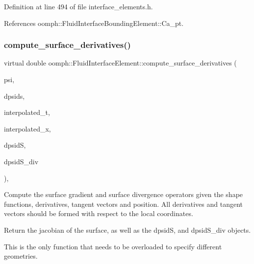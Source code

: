 Definition at line 494 of file interface\+\_\+elements.\+h.



References oomph\+::\+Fluid\+Interface\+Bounding\+Element\+::\+Ca\+\_\+pt.

\mbox{\label{classoomph_1_1FluidInterfaceElement_a0180a8e36fadbbe6984f9b3c5edffc81}} 
\subsubsection{\texorpdfstring{compute\+\_\+surface\+\_\+derivatives()}{compute\_surface\_derivatives()}}
{\footnotesize\ttfamily virtual double oomph\+::\+Fluid\+Interface\+Element\+::compute\+\_\+surface\+\_\+derivatives (\begin{DoxyParamCaption}\item[{const \hyperlink{classoomph_1_1Shape}{Shape} \&}]{psi,  }\item[{const \hyperlink{classoomph_1_1DShape}{D\+Shape} \&}]{dpsids,  }\item[{const \hyperlink{classoomph_1_1DenseMatrix}{Dense\+Matrix}$<$ double $>$ \&}]{interpolated\+\_\+t,  }\item[{const \hyperlink{classoomph_1_1Vector}{Vector}$<$ double $>$ \&}]{interpolated\+\_\+x,  }\item[{\hyperlink{classoomph_1_1DShape}{D\+Shape} \&}]{dpsidS,  }\item[{\hyperlink{classoomph_1_1DShape}{D\+Shape} \&}]{dpsid\+S\+\_\+div }\end{DoxyParamCaption})\hspace{0.3cm}{\ttfamily [protected]}, {}}



Compute the surface gradient and surface divergence operators given the shape functions, derivatives, tangent vectors and position. All derivatives and tangent vectors should be formed with respect to the local coordinates. 

Return the jacobian of the surface, as well as the dpsidS, and dpsid\+S\+\_\+div objects.

This is the only function that needs to be overloaded to specify different geometries.

